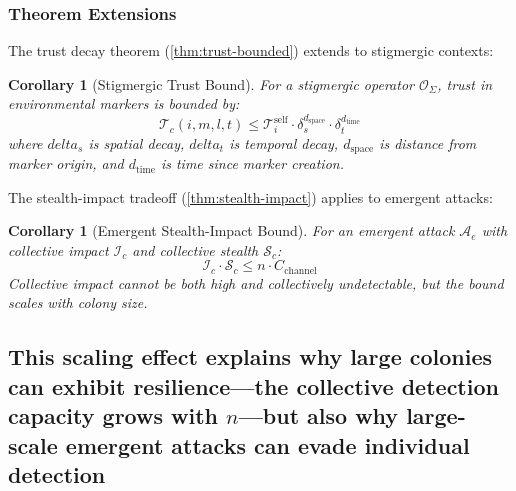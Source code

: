 \documentclass[
]{article}
\newtheorem{corollary}[theorem]{Corollary}
\begin{document}
\subsubsection{Theorem Extensions}\label{sec:theorem-extensions}

The trust decay theorem (\cref{thm:trust-bounded}) extends to stigmergic
contexts:

\begin{corollary}[Stigmergic Trust Bound]
\label{cor:stigmergic-trust}
For a stigmergic operator $\mathcal{O}_\Sigma$, trust in environmental markers is bounded by:
\begin{equation}
\label{eq:stigmergic-trust-bound}
\mathcal{T}_{c}(i, m, l, t) \leq \mathcal{T}_{i}^{\text{self}} \cdot \delta_s^{d_{\text{space}}} \cdot \delta_t^{d_{\text{time}}}
\end{equation}
where $delta_s$ is spatial decay, $delta_t$ is temporal decay, $d_{\text{space}}$ is distance from marker origin, and $d_{\text{time}}$ is time since marker creation.
\end{corollary}

The stealth-impact tradeoff (\cref{thm:stealth-impact}) applies to
emergent attacks:

\begin{corollary}[Emergent Stealth-Impact Bound]
\label{cor:emergent-stealth-impact}
For an emergent attack $\mathcal{A}_e$ with collective impact $\mathcal{I}_c$ and collective stealth $\mathcal{S}_c$:
\begin{equation}
\label{eq:emergent-stealth-impact}
\mathcal{I}_c \cdot \mathcal{S}_c \leq n \cdot C_{\text{channel}}
\end{equation}
Collective impact cannot be both high and collectively undetectable, but the bound scales with colony size.
\end{corollary}

\subsection{\texorpdfstring{This scaling effect explains why large
colonies can exhibit resilience---the collective detection capacity
grows with \(n\)---but also why large-scale emergent attacks can evade
individual
detection}{This scaling effect explains why large colonies can exhibit resilience---the collective detection capacity grows with n---but also why large-scale emergent attacks can evade individual detection}}\label{this-scaling-effect-explains-why-large-colonies-can-exhibit-resiliencethe-collective-detection-capacity-grows-with-nbut-also-why-large-scale-emergent-attacks-can-evade-individual-detection}
\end{document}
